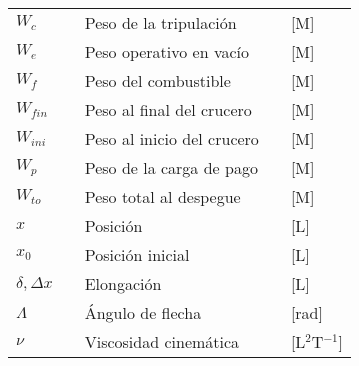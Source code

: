 \begin{longtable*}{p{20mm} c p{80mm} c p{40mm} }
$W_{c}$ 		&& Peso de la tripulación       && [M]\\
$W_{e}$	    	&& Peso operativo en vacío      && [M]\\
$W_{f}$ 		&& Peso del combustible         && [M]\\
$W_{fin}$ 		&& Peso al final del crucero    && [M]\\
$W_{ini}$ 		&& Peso al inicio del crucero   && [M]\\
$W_{p}$		    && Peso de la carga de pago     && [M]\\
$W_{to}$ 		&& Peso total al despegue       && [M]\\
$x$ 		    && Posición                     && [L]\\
$x_0$ 		    && Posición inicial             && [L]\\
$\delta, \Delta x$ 		&& Elongación                   && [L]\\
$\Lambda$       && Ángulo de flecha             && [rad]\\
$\nu$ 		    && Viscosidad cinemática        && [L$^2$T$^{-1}$]\\

\end{longtable*}